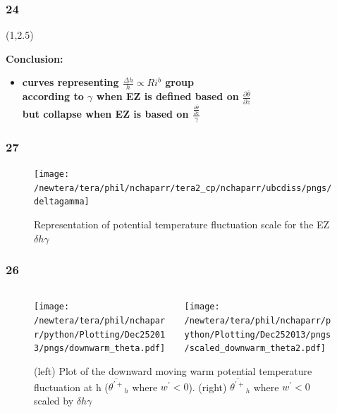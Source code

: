 \documentclass{beamer}
\newcommand\FrameText[1]{
\begin{textblock}{16}(1,2.5)
\raggedright #1
\end{textblock}}
\begin{document}
\begin{frame}
\frametitle{24}
\FrameText{\bf{\Large Conclusion}:
\vspace{5mm}
\begin{itemize}
\item \bf{\Large curves representing $\frac{\Delta h}{h} \propto Ri ^{b}$ group\\
according to $\gamma$ when EZ is defined based on $\frac{\partial \overline{\theta}}{\partial z}$\\
but collapse when EZ is based on $\frac{\frac{\partial \overline{\theta}}{\partial z}}{\gamma}$} 
\end{itemize}
}
\end{frame}


\begin{frame}
\frametitle{27}
\fontsize{12pt}{7.2}\selectfont
\begin{figure}
\texttt{[image: /newtera/tera/phil/nchaparr/tera2\_cp/nchaparr/ubcdiss/pngs/deltagamma]}
\caption{Representation of potential temperature fluctuation scale for the EZ $\delta h \gamma$}
\end{figure}
\end{frame}


\begin{frame}
\fontsize{12pt}{7.2}\selectfont
\frametitle{26}
\begin{figure}
\begin{columns}[T]
   \begin{column}{.5\textwidth}
   \texttt{[image: /newtera/tera/phil/nchaparr/python/Plotting/Dec252013/pngs/downwarm\_theta.pdf]} 
   \end{column} 
   
   \begin{column}{.5\textwidth}
    \texttt{[image: /newtera/tera/phil/nchaparr/python/Plotting/Dec252013/pngs/scaled\_downwarm\_theta2.pdf]}
   \end{column}     
\end{columns}
\caption{(left) Plot of the downward moving warm potential temperature fluctuation at h ($\overline{\theta^{'+}}_{h}$ where $w^{'}<0$). (right) $\overline{\theta^{'+}}_{h}$ where $w^{'}<0$ scaled by $\delta h \gamma$}
\end{figure}
\end{frame}
\end{document}
